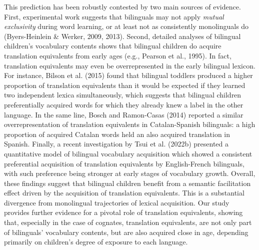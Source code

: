 \documentclass[
  man,
  floatsintext,
  colorlinks=true,linkcolor=blue,citecolor=blue,urlcolor=blue,biblatex]{apa7}
\begin{document}
This prediction has been robustly contested by two main sources of
evidence. First, experimental work suggests that bilinguals may not
apply \emph{mutual exclusivity} during word learning, or at least not as
consistently monolinguals do (Byers-Heinlein \& Werker, 2009, 2013).
Second, detailed analyses of bilingual children's vocabulary contents
shows that bilingual children do acquire translation equivalents from
early ages (e.g., Pearson et al., 1995). In fact, translation
equivalents may even be overrepresented in the early bilingual lexicon.
For instance, Bilson et al. (2015) found that bilingual toddlers
produced a higher proportion of translation equivalents than it would be
expected if they learned two independent lexica simultaneously, which
suggests that bilingual children preferentially acquired words for which
they already knew a label in the other language. In the same line, Bosch
and Ramon-Casas (2014) reported a similar overrepresentation of
translation equivalents in Catalan-Spanish bilinguals: a high proportion
of acquired Catalan words held an also acquired translation in Spanish.
Finally, a recent investigation by Tsui et al. (2022b) presented a
quantitative model of bilingual vocabulary acquisition which showed a
consistent preferential acquisition of translation equivalents by
English-French bilinguals, with such preference being stronger at early
stages of vocabulary growth. Overall, these findings suggest that
bilingual children benefit from a semantic facilitation effect driven by
the acquisition of translation equivalents. This is a substantial
divergence from monolingual trajectories of lexical acquisition. Our
study provides further evidence for a pivotal role of translation
equivalents, showing that, especially in the case of cognates,
translation equivalents, are not only part of bilinguals' vocabulary
contents, but are also acquired close in age, depending primarily on
children's degree of exposure to each language.
\end{document}
